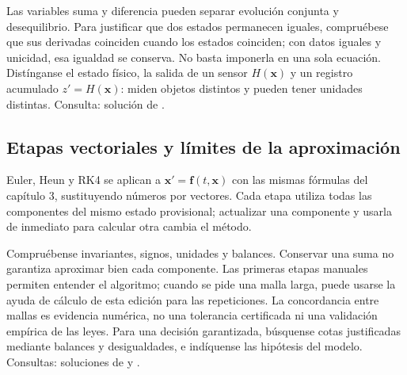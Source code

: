 Las variables suma y diferencia pueden separar evolución conjunta y
desequilibrio. Para justificar que dos estados permanecen iguales,
compruébese que sus derivadas coinciden cuando los estados coinciden;
con datos iguales y unicidad, esa igualdad se conserva. No basta imponerla
en una sola ecuación. Distínganse el estado físico, la salida de un sensor
$H(\mathbf x)$ y un registro acumulado
$z'=H(\mathbf x)$: miden objetos distintos y pueden tener unidades
distintas. Consulta: solución de .

%
\subsection*{Etapas vectoriales y límites de la aproximación}
\label{CH07-B04}
Euler, Heun y RK4 se aplican a $\mathbf x'=\mathbf f(t,\mathbf x)$
con las mismas fórmulas del capítulo 3, sustituyendo números por vectores.
Cada etapa utiliza todas las componentes del mismo estado provisional;
actualizar una componente y usarla de inmediato para calcular otra cambia
el método.

Compruébense invariantes, signos, unidades y balances. Conservar una suma
no garantiza aproximar bien cada componente. Las primeras etapas manuales
permiten entender el algoritmo; cuando se pide una malla larga, puede usarse
la ayuda de cálculo de esta edición para las repeticiones.
La concordancia entre mallas es evidencia numérica, no una tolerancia
certificada ni una validación empírica de las leyes. Para una decisión
garantizada, búsquense cotas justificadas mediante balances y
desigualdades, e indíquense las hipótesis del modelo.
Consultas: soluciones de  y .
